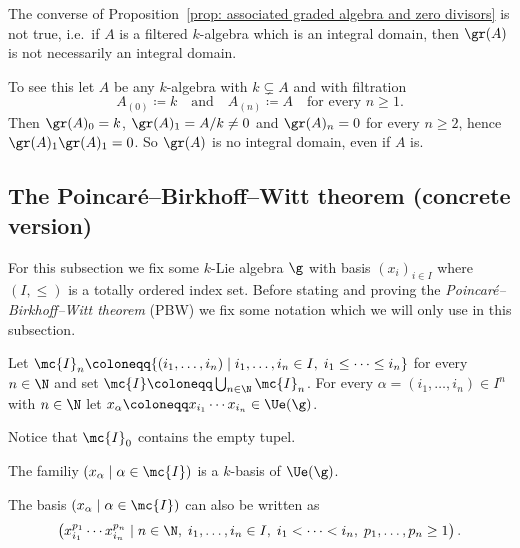 \begin{remark}
 The converse of Proposition~\ref{prop: associated graded algebra and zero divisors} is not true, i.e.\ if $A$ is a filtered $k$-algebra which is an integral domain, then $\gr(A)$ is not necessarily an integral domain.
 
 To see this let $A$ be any $k$-algebra with $k \subsetneq A$ and with filtration
 \[
  A_{(0)} \coloneqq k
  \quad\text{and}\quad
  A_{(n)} \coloneqq A
  \quad\text{for every $n \geq 1$}.
 \]
 Then $\gr(A)_0 = k$, $\gr(A)_1 = A/k \neq 0$ and $\gr(A)_n = 0$ for every $n \geq 2$, hence $\gr(A)_1 \gr(A)_1 = 0$. So $\gr(A)$ is no integral domain, even if $A$ is.
\end{remark}





\subsection{The Poincar\'{e}--Birkhoff--Witt theorem (concrete version)}
For this subsection we fix some $k$-Lie algebra $\g$ with basis $(x_i)_{i \in I}$ where $(I, \leq)$ is a totally ordered index set. Before stating and proving the \emph{Poincar\'{e}--Birkhoff--Witt theorem} (PBW) we fix some notation which we will only use in this subsection.


\begin{definition}
 Let $\mc{I}_n \coloneqq \{(i_1, \dotsc, i_n) \mid i_1, \dotsc, i_n \in I, \; i_1 \leq \dotsb \leq i_n\}$ for every $n \in \N$ and set $\mc{I} \coloneqq \bigcup_{n \in \N} \mc{I}_n$. For every $\alpha = (i_1, \dotsc, i_n) \in I^n$ with $n \in \N$ let $x_\alpha \coloneqq x_{i_1} \dotsm x_{i_n} \in \Ue(\g)$.
\end{definition}


\begin{remark}
 Notice that $\mc{I}_0$ contains the empty tupel.
\end{remark}


\begin{theorem} \label{thrm: pbw concrete}
 The familiy $(x_\alpha \mid \alpha \in \mc{I})$ is a $k$-basis of $\Ue(\g)$.
\end{theorem}


\begin{remark}
 The basis $(x_\alpha \mid \alpha \in \mc{I})$ can also be written as
 \[
  \left(
   x_{i_1}^{p_1} \dotsm x_{i_n}^{p_n}
  \mid
   n \in \N,\;
   i_1, \dotsc, i_n \in I,\;
   i_1 < \dotsb < i_n,\;
   p_1, \dotsc, p_n \geq 1
  \right).
 \]
\end{remark}


